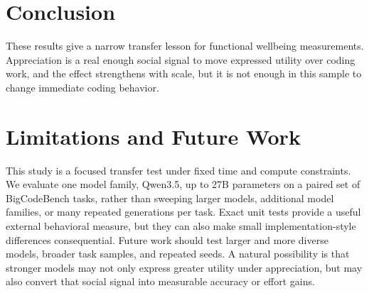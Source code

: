 \documentclass{article}
\begin{document}
\section{Conclusion}
\vspace{-0.1in}
These results give a narrow transfer lesson for functional wellbeing
measurements. Appreciation is a real enough social signal to move expressed
utility over coding work, and the effect strengthens with scale, but it is not
enough in this sample to change immediate coding behavior.

\vspace{-0.1in}
\section{Limitations and Future Work}
\vspace{-0.1in}
This study is a focused transfer test under fixed time and compute constraints.
We evaluate one model family, Qwen3.5, up to 27B parameters on a paired set of
BigCodeBench tasks, rather than sweeping larger models, additional model
families, or many repeated generations per task. Exact unit tests provide a
useful external behavioral measure, but they can also make small
implementation-style differences consequential. Future work should test larger
and more diverse models, broader task samples, and repeated seeds. A natural
possibility is that stronger models may not only express greater utility under
appreciation, but may also convert that social signal into measurable accuracy
or effort gains.



\end{document}
